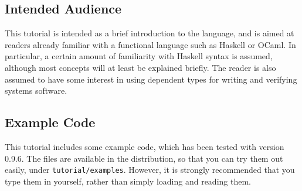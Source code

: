 \subsection{Intended Audience}

This tutorial is intended as a brief introduction to the language, and is aimed
at readers already familiar with a functional language such as Haskell or
OCaml. In particular, a certain amount of familiarity with Haskell syntax is
assumed, although most concepts will at least be explained briefly.  The reader
is also assumed to have some interest in using dependent types for writing and
verifying systems software.

\subsection{Example Code}

This tutorial includes some example code, which has been tested with \Idris{} version
0.9.6. The files are available in the \Idris{} distribution,
so that you can try them out easily,
under \texttt{tutorial/examples}. However, it is strongly recommended that you
type them in yourself, rather than simply loading and reading them.
